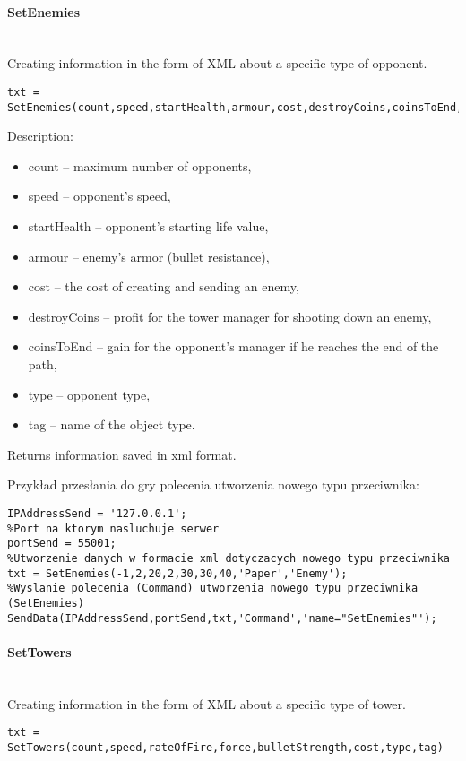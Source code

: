 \paragraph{SetEnemies} \hspace{0pt} \\
Creating information in the form of XML about a specific type of opponent.
\begin{lstlisting}[style=Matlab-editor]
txt = SetEnemies(count,speed,startHealth,armour,cost,destroyCoins,coinsToEnd,type,tag)
\end{lstlisting}

Description:
\begin{itemize}
\item count -- maximum number of opponents,
\item speed -- opponent's speed,
\item startHealth -- opponent's starting life value,
\item armour -- enemy's armor (bullet resistance),
\item cost -- the cost of creating and sending an enemy,
\item destroyCoins -- profit for the tower manager for shooting down an enemy,
\item coinsToEnd -- gain for the opponent's manager if he reaches the end of the path,
\item type -- opponent type,
\item tag -- name of the object type.
\end{itemize}

Returns information saved in xml format.

Przykład przesłania do gry polecenia utworzenia nowego typu przeciwnika:
\begin{lstlisting}[style=Matlab-editor]
%Adres serwera
IPAddressSend = '127.0.0.1';
%Port na ktorym nasluchuje serwer
portSend = 55001;
%Utworzenie danych w formacie xml dotyczacych nowego typu przeciwnika
txt = SetEnemies(-1,2,20,2,30,30,40,'Paper','Enemy');
%Wyslanie polecenia (Command) utworzenia nowego typu przeciwnika (SetEnemies)
SendData(IPAddressSend,portSend,txt,'Command','name="SetEnemies"');
\end{lstlisting}

\paragraph{SetTowers} \hspace{0pt} \\
Creating information in the form of XML about a specific type of tower.
\begin{lstlisting}[style=Matlab-editor]
txt = SetTowers(count,speed,rateOfFire,force,bulletStrength,cost,type,tag)
\end{lstlisting}

